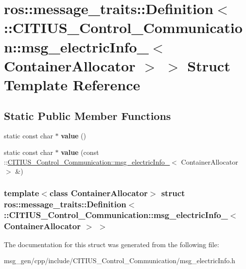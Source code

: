 \hypertarget{structros_1_1message__traits_1_1_definition_3_01_1_1_c_i_t_i_u_s___control___communication_1_1msb5b845500fcdfcb775b12b1cb72581f0}{\section{ros\-:\-:message\-\_\-traits\-:\-:\-Definition$<$ \-:\-:\-C\-I\-T\-I\-U\-S\-\_\-\-Control\-\_\-\-Communication\-:\-:msg\-\_\-electric\-Info\-\_\-$<$ \-Container\-Allocator $>$ $>$ \-Struct \-Template \-Reference}
\label{structros_1_1message__traits_1_1_definition_3_01_1_1_c_i_t_i_u_s___control___communication_1_1msb5b845500fcdfcb775b12b1cb72581f0}
}
\subsection*{\-Static \-Public \-Member \-Functions}
\begin{DoxyCompactItemize}
\item 
\hypertarget{structros_1_1message__traits_1_1_definition_3_01_1_1_c_i_t_i_u_s___control___communication_1_1msb5b845500fcdfcb775b12b1cb72581f0_a6daed49b06abb639c414c21e3af0130c}{static const char $\ast$ {\bfseries value} ()}\label{structros_1_1message__traits_1_1_definition_3_01_1_1_c_i_t_i_u_s___control___communication_1_1msb5b845500fcdfcb775b12b1cb72581f0_a6daed49b06abb639c414c21e3af0130c}

\item 
\hypertarget{structros_1_1message__traits_1_1_definition_3_01_1_1_c_i_t_i_u_s___control___communication_1_1msb5b845500fcdfcb775b12b1cb72581f0_adbb377f7313fe804e29a520ee2762c51}{static const char $\ast$ {\bfseries value} (const \-::\hyperlink{struct_c_i_t_i_u_s___control___communication_1_1msg__electric_info__}{\-C\-I\-T\-I\-U\-S\-\_\-\-Control\-\_\-\-Communication\-::msg\-\_\-electric\-Info\-\_\-}$<$ \-Container\-Allocator $>$ \&)}\label{structros_1_1message__traits_1_1_definition_3_01_1_1_c_i_t_i_u_s___control___communication_1_1msb5b845500fcdfcb775b12b1cb72581f0_adbb377f7313fe804e29a520ee2762c51}

\end{DoxyCompactItemize}
\subsubsection*{template$<$class Container\-Allocator$>$ struct ros\-::message\-\_\-traits\-::\-Definition$<$ \-::\-C\-I\-T\-I\-U\-S\-\_\-\-Control\-\_\-\-Communication\-::msg\-\_\-electric\-Info\-\_\-$<$ Container\-Allocator $>$ $>$}



\-The documentation for this struct was generated from the following file\-:\begin{DoxyCompactItemize}
\item 
msg\-\_\-gen/cpp/include/\-C\-I\-T\-I\-U\-S\-\_\-\-Control\-\_\-\-Communication/msg\-\_\-electric\-Info.\-h\end{DoxyCompactItemize}
